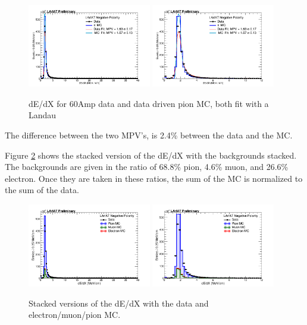 \begin{figure}[htb]
\centering
\includegraphics[width=0.48\textwidth]{Studies/Figures/dEdX_Fit_v1.png}
\includegraphics[width=0.48\textwidth]{Studies/Figures/dEdX_Fit_v4.png}
\caption[]{ dE/dX for 60Amp data and data driven pion MC, both fit with a Landau  } \label{fig:dEdXLinearScale}
\end{figure}

The difference between the two MPV's, is 2.4\% between the data and the MC.

Figure \ref{fig:dEdXLinearStacked} shows the stacked version of the dE/dX with the backgrounds stacked. The backgrounds are given in the ratio of 68.8\% pion, 4.6\% muon, and 26.6\% electron. Once they are taken in these ratios, the sum of the MC is normalized to the sum of the data.

\begin{figure}[htb]
\centering
\includegraphics[width=0.48\textwidth]{Studies/Figures/dEdX_stacked_v1.png}
\includegraphics[width=0.48\textwidth]{Studies/Figures/dEdX_stacked_v4.png}
\caption[]{ Stacked versions of the dE/dX with the data and electron/muon/pion MC.  } \label{fig:dEdXLinearStacked}
\end{figure}

